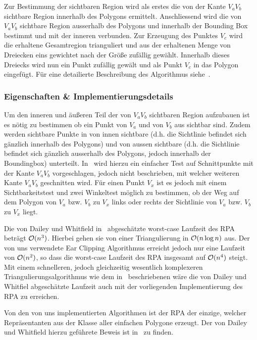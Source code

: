     Zur Bestimmung der sichtbaren Region wird als erstes die von der Kante 
    $V_aV_b$
    sichtbare Region innerhalb des Polygons ermittelt. Anschliessend wird die
    von $V_aV_b$ sichtbare Region ausserhalb des Polygons und innerhalb der
    Bounding Box bestimmt und mit der inneren verbunden. Zur Erzeugung des
    Punktes $V_c$ wird die erhaltene Gesamtregion trianguliert und aus der
    erhaltenen Menge von Dreiecken eins gewichtet nach der Größe zufällig
    gewählt. Innerhalb dieses Dreiecks wird nun ein Punkt zufällig gewält und
    als Punkt $V_c$ in das Polygon eingefügt. Für eine detailierte Beschreibung
    des Algorithmus siehe~\cite{dailey08rpa}.
  

  \subsubsection{Eigenschaften \& Implementierungsdetails} %
  \label{ssub:eigenschaften}

    Um den inneren und äußeren Teil der von $V_aV_b$ sichtbaren Region
    aufzubauen ist es nötig zu bestimmen ob ein Punkt von $V_a$ und von $V_b$
    aus sichtbar sind. Zudem werden sichtbare Punkte in von innen sichtbare
    (d.h. die Sichtlinie befindet sich gänzlich innerhalb des Polygons) und
    von aussen sichtbare (d.h. die Sichtlinie befindet sich gänzlich
    ausserhalb des Polygons, jedoch innerhalb der Boundingbox) unterteilt.
    In~\cite{dailey08rpa} wird hierzu ein einfacher Test auf Schnittpunkte mit
    der Kante $V_aV_b$ vorgeschlagen, jedoch nicht beschrieben, mit welcher
    weiteren Kante $V_aV_b$ geschnitten wird. Für einen Punkt $V_x$ ist es
    jedoch mit einem Sichtbarkeitstest und zwei Winkeltest möglich zu
    bestimmen, ob der Weg auf dem Polygon von $V_a$ bzw. $V_b$ zu $V_x$ links
    oder rechts der Sichtlinie von $V_a$ bzw. $V_b$ zu $V_x$ liegt.

    Die von Dailey und Whitfield in~\cite{dailey08rpa} abgeschätzte worst-case
    Laufzeit des RPA beträgt $\mathcal{O}(n^3)$. Hierbei gehen sie von einer
    Triangulierung in $\mathcal{O}(n \log n)$ aus. Der von uns verwendete Ear
    Clipping Algorithmus erreicht jedoch nur eine Laufzeit von $\mathcal{O}(n^2)$,
    so dass die worst-case Laufzeit des RPA insgesamt auf $\mathcal{O}(n^4)$ steigt.
    Mit einem schnelleren, jedoch gleichzeitig wesentlich komplexeren
    Triangulierungsalgorithmus wie dem in~\cite{seidel91asimple} beschriebenen 
    wäre die von Dailey und Whitfiel abgeschätzte Laufzeit auch mit der
    vorliegenden Implementierung des RPA zu erreichen.

    Von den von uns implementierten Algorithmen ist der RPA der einzige,
    welcher Repräsentanten aus der Klasse aller einfachen Polygone erzeugt.
    Der von Dailey und Whitfield hierzu geführete Beweis ist 
    in~\cite{dailey08rpa} zu finden.


